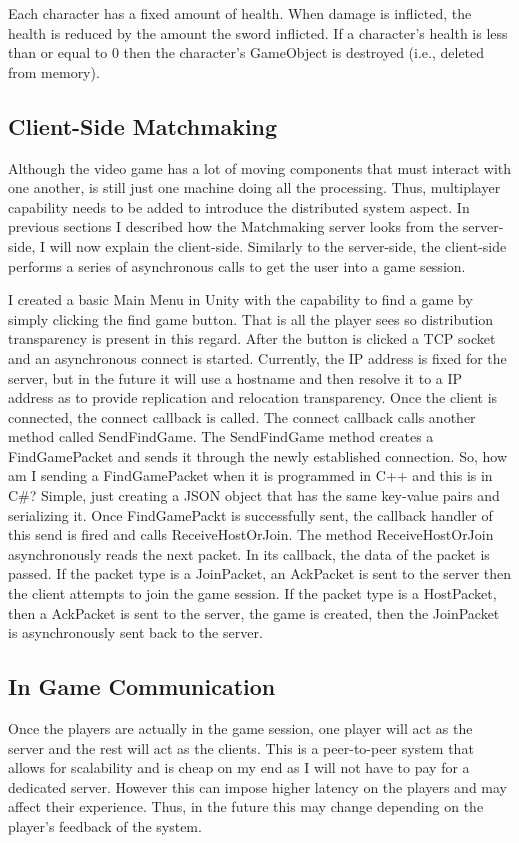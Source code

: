 \documentclass[conference]{IEEEtran}
\begin{document}
Each character has a fixed amount of health.
When damage is inflicted, the health is reduced by the amount the sword inflicted.
If a character’s health is less than or equal to 0 then the character’s GameObject is destroyed (i.e., deleted from memory).

\subsection{Client-Side Matchmaking}
Although the video game has a lot of moving components that must interact with one another, is still just one machine doing all the processing.
Thus, multiplayer capability needs to be added to introduce the distributed system aspect.
In previous sections I described how the Matchmaking server looks from the server-side, I will now explain the client-side.
Similarly to the server-side, the client-side performs a series of asynchronous calls to get the user into a game session.

I created a basic Main Menu in Unity with  the capability to find a game by simply clicking the find game button.
That is all the player sees so distribution transparency is present in this regard.
After the button is clicked a TCP socket and an asynchronous connect is started.
Currently, the IP address is fixed for the server, but in the future it will use a hostname and then resolve it to a IP address as to provide replication and relocation transparency.
Once the client is connected, the connect callback is called.
The connect callback calls another method called SendFindGame.
The SendFindGame method creates a FindGamePacket and sends it through the newly established connection.
So, how am I sending a FindGamePacket when it is programmed in C++ and this is in C#?
Simple, just creating a JSON object that has the same key-value pairs and serializing it.
Once FindGamePackt is successfully sent, the callback handler of this send is fired and calls ReceiveHostOrJoin.
The method ReceiveHostOrJoin asynchronously reads the next packet.
In its callback, the data of the packet is passed.
If the packet type is a JoinPacket, an AckPacket is sent to the server then the client attempts to join the game session.
If the packet type is a HostPacket, then a AckPacket is sent to the server,  the game is created, then the JoinPacket is asynchronously sent back to the server.

\subsection{In Game Communication}
Once the players are actually in the game session, one player will act as the server and the rest will act as the clients.
This is a peer-to-peer system that allows for scalability and is cheap on my end as I will not have to pay for a dedicated server.
However this can impose higher latency on the players and may affect their experience.
Thus, in the future this may change depending on the player’s feedback of the system.
\end{document}
